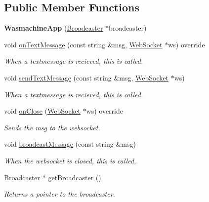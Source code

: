 \subsection*{Public Member Functions}
\begin{DoxyCompactItemize}
\item 
{\bfseries Wasmachine\+App} (\hyperlink{class_broadcaster}{Broadcaster} $\ast$broadcaster)\hypertarget{class_wasmachine_app_a31b563084ec85509613ecb590ada5e3b}{}\label{class_wasmachine_app_a31b563084ec85509613ecb590ada5e3b}

\item 
void \hyperlink{class_wasmachine_app_a259cd59762cb773cf84d4ba6e007cf16}{on\+Text\+Message} (const string \&msg, \hyperlink{class_web_socket}{Web\+Socket} $\ast$ws) override
\begin{DoxyCompactList}\small\item\em When a textmessage is recieved, this is called. \end{DoxyCompactList}\item 
void \hyperlink{class_wasmachine_app_a9cab93c6a2013c8fff9d1d10965373fc}{send\+Text\+Message} (const string \&msg, \hyperlink{class_web_socket}{Web\+Socket} $\ast$ws)
\begin{DoxyCompactList}\small\item\em When a textmessage is recieved, this is called. \end{DoxyCompactList}\item 
void \hyperlink{class_wasmachine_app_ab090e05b9c6f65dee323066cc169dc1a}{on\+Close} (\hyperlink{class_web_socket}{Web\+Socket} $\ast$ws) override
\begin{DoxyCompactList}\small\item\em Sends the msg to the websocket. \end{DoxyCompactList}\item 
void \hyperlink{class_wasmachine_app_a75c3d4e9212421f9e587be6f8831643b}{broadcast\+Message} (const string \&msg)
\begin{DoxyCompactList}\small\item\em When the websocket is closed, this is called. \end{DoxyCompactList}\item 
\hyperlink{class_broadcaster}{Broadcaster} $\ast$ \hyperlink{class_wasmachine_app_a39959c6696735b05dabc8028966ed36f}{get\+Broadcaster} ()
\begin{DoxyCompactList}\small\item\em Returns a pointer to the broadcaster. \end{DoxyCompactList}\end{DoxyCompactItemize}


